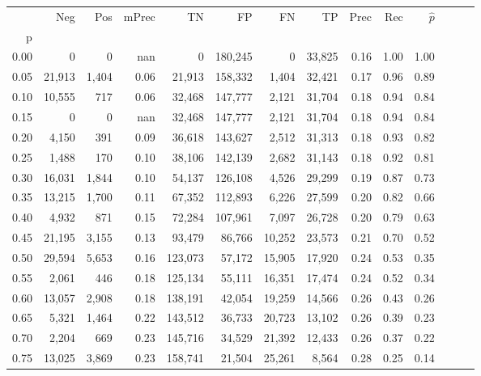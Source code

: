 \begin{tabular}{rrrrrrrrrrrrrr}
\toprule
{} &     Neg &    Pos & mPrec &       TN &       FP &      FN &      TP &  Prec &   Rec & $\hat{p}$ \\
p    &         &        &       &          &          &         &         &       &       &           \\
\midrule
0.00 &       0 &      0 &   nan &        0 &  180,245 &       0 &  33,825 &  0.16 &  1.00 &      1.00 \\
0.05 &  21,913 &  1,404 &  0.06 &   21,913 &  158,332 &   1,404 &  32,421 &  0.17 &  0.96 &      0.89 \\
0.10 &  10,555 &    717 &  0.06 &   32,468 &  147,777 &   2,121 &  31,704 &  0.18 &  0.94 &      0.84 \\
0.15 &       0 &      0 &   nan &   32,468 &  147,777 &   2,121 &  31,704 &  0.18 &  0.94 &      0.84 \\
0.20 &   4,150 &    391 &  0.09 &   36,618 &  143,627 &   2,512 &  31,313 &  0.18 &  0.93 &      0.82 \\
0.25 &   1,488 &    170 &  0.10 &   38,106 &  142,139 &   2,682 &  31,143 &  0.18 &  0.92 &      0.81 \\
0.30 &  16,031 &  1,844 &  0.10 &   54,137 &  126,108 &   4,526 &  29,299 &  0.19 &  0.87 &      0.73 \\
0.35 &  13,215 &  1,700 &  0.11 &   67,352 &  112,893 &   6,226 &  27,599 &  0.20 &  0.82 &      0.66 \\
0.40 &   4,932 &    871 &  0.15 &   72,284 &  107,961 &   7,097 &  26,728 &  0.20 &  0.79 &      0.63 \\
0.45 &  21,195 &  3,155 &  0.13 &   93,479 &   86,766 &  10,252 &  23,573 &  0.21 &  0.70 &      0.52 \\
0.50 &  29,594 &  5,653 &  0.16 &  123,073 &   57,172 &  15,905 &  17,920 &  0.24 &  0.53 &      0.35 \\
0.55 &   2,061 &    446 &  0.18 &  125,134 &   55,111 &  16,351 &  17,474 &  0.24 &  0.52 &      0.34 \\
0.60 &  13,057 &  2,908 &  0.18 &  138,191 &   42,054 &  19,259 &  14,566 &  0.26 &  0.43 &      0.26 \\
0.65 &   5,321 &  1,464 &  0.22 &  143,512 &   36,733 &  20,723 &  13,102 &  0.26 &  0.39 &      0.23 \\
0.70 &   2,204 &    669 &  0.23 &  145,716 &   34,529 &  21,392 &  12,433 &  0.26 &  0.37 &      0.22 \\
0.75 &  13,025 &  3,869 &  0.23 &  158,741 &   21,504 &  25,261 &   8,564 &  0.28 &  0.25 &      0.14 \\

\end{tabular}
